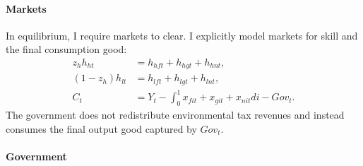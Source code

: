 \begin{comment}
\paragraph{Impossibility of reaching target in laissez-faire with exogenous growth}
\tr{Note that this is wrong! There is an option for the gov to affect inflation which then redirects demand.}
Note that with exogenous growth in each sector there is no possibility for the government to stop emissions from growing, since production of the dirty good is essential for the consumption good (no perfect substitution: $\varepsilon<\infty$). To meet the emission target, the government either needs to affect the growth rate in the economy; i.e., $\upsilon_j$ is a choice variable, or work and consumption need to be set to zero; or the emission target has to be defined in relative terms. The latter possibility contradicts the Paris Agreement which is concerned with absolute emissions.  
I therefore assume, that the government can change the growth rate.

The government chooses the growth rate in each sector, taking into account that research is constrained by an exogenous  amount of scientists
\begin{align}
\upsilon_{ct}+\upsilon_{dt}\leq\Upsilon
\end{align}
\end{comment} 
  
\paragraph{Markets}
In equilibrium, I require markets to clear. I explicitly model markets for skill and the final consumption good:
\begin{align}
z_h h_{ht}&=h_{hft}+h_{hgt}+h_{hnt},\\
(1-z_h) h_{lt}&=h_{lft}+h_{lgt}+h_{lnt},\\
C_t&=Y_t-\int_{0}^{1}x_{fit}+x_{git}+x_{nit}di-Gov_t.
\end{align}
The government does not redistribute environmental tax revenues and instead consumes the final output good captured by $Gov_t$. 

\paragraph{Government}

